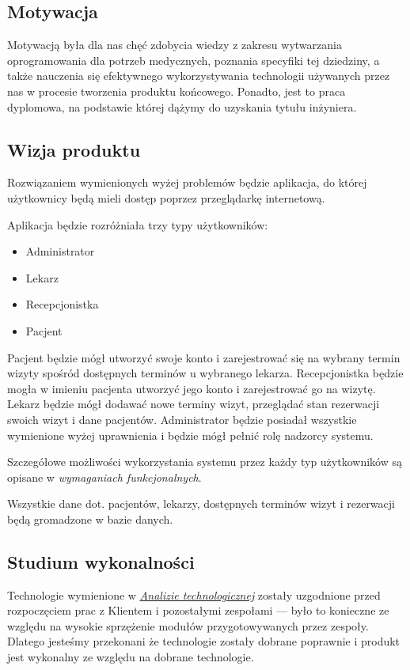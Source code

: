 \documentclass[polish,12pt]{aghthesis}
\begin{document}
\subsection{Motywacja}
Motywacją była dla nas chęć zdobycia wiedzy z zakresu wytwarzania oprogramowania dla potrzeb medycznych, poznania specyfiki tej dziedziny, a także nauczenia się efektywnego wykorzystywania technologii używanych przez nas w procesie tworzenia produktu końcowego. Ponadto, jest to praca dyplomowa, na podstawie której dążymy do uzyskania tytułu inżyniera.

\subsection{Wizja produktu}
Rozwiązaniem wymienionych wyżej problemów będzie aplikacja, do której użytkownicy będą mieli dostęp poprzez przeglądarkę internetową.

Aplikacja będzie rozróżniała trzy typy użytkowników:
\begin{itemize}
    \item Administrator
    \item Lekarz
    \item Recepcjonistka
    \item Pacjent
\end{itemize}

Pacjent będzie mógł utworzyć swoje konto i zarejestrować się na wybrany termin wizyty spośród dostępnych terminów u wybranego lekarza. Recepcjonistka będzie mogła w imieniu pacjenta utworzyć jego konto i zarejestrować go na wizytę. Lekarz będzie mógł dodawać nowe terminy wizyt, przeglądać stan rezerwacji swoich wizyt i dane pacjentów. Administrator będzie posiadał wszystkie wymienione wyżej uprawnienia i będzie mógł pełnić rolę nadzorcy systemu.

Szczegółowe możliwości wykorzystania systemu przez każdy typ użytkowników są opisane w \emph{wymaganiach funkcjonalnych}.

Wszystkie dane dot. pacjentów, lekarzy, dostępnych terminów wizyt i rezerwacji będą gromadzone w bazie danych.

\subsection{Studium wykonalności}
Technologie wymienione w \hyperref[subsec:analizaTechnologiczna]{\emph{Analizie technologicznej}} zostały uzgodnione przed rozpoczęciem prac z Klientem i pozostałymi zespołami --- było to konieczne ze względu na wysokie sprzężenie modułów przygotowywanych przez zespoły. Dlatego jesteśmy przekonani że technologie zostały dobrane poprawnie i produkt jest wykonalny ze względu na dobrane technologie.
\end{document}
